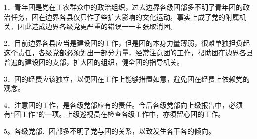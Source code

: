 1．青年团是党在工农群众中的政治组织，过去边界各级团部多不明了青年团的政治任务，团在边界各县仅只作了些扩大影响的文化运动。事实上成了党的附属机关，因此造成边界各级党更严重的错误一一主张取消团。

2．目前边界各县应当是建设团的工作，但是团的本身力量薄弱，很难单独担负起这个责任，各级党部必须划出一部分力量，经常注意团的工作，帮助团在边界各县普遍的建设团的支部，扩大团的组织，健全团的指导机关。

3．团的经费应该独立，以便团在工作上能够措置如意，避免团在经费上依赖党的观念。

4．注意团的工作，是各级党部应有的责任。今后各级党部向上级报告中，必须有“团工作”的一项。上级巡视员在检查各级工作中，亦须留心团的工作。

5。各级党部、团部多不明了党与团的关系，以致发生各干各的倾向。

